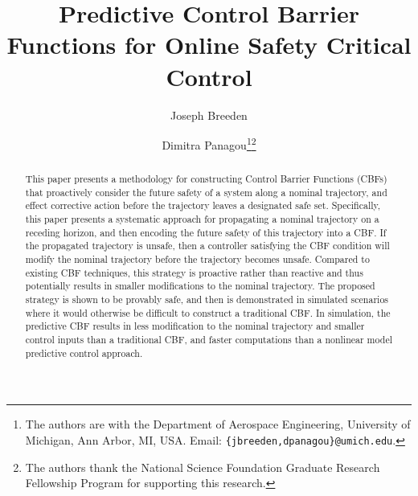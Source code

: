 \documentclass[10pt,conference]{ieeeconf}
\newcommand{\todo}[1]{\textcolor{red}{To Do: #1}}
\renewcommand{\(}{\left(}
\renewcommand{\)}{\right)}
\renewcommand{\[}{\left[}
\renewcommand{\]}{\right]}
\begin{document}
\title{{\fontsize{16}{16} \bf Predictive Control Barrier Functions for Online Safety Critical Control}}%

\author{Joseph Breeden \and Dimitra Panagou\thanks{The authors are with the Department of Aerospace Engineering, University of Michigan, Ann Arbor, MI, USA. Email: \texttt{\{jbreeden,dpanagou\}@umich.edu}.}\thanks{The authors thank the National Science Foundation Graduate Research Fellowship Program for supporting this research.}}

\maketitle

\begin{abstract}
	
This paper presents a methodology for constructing Control Barrier Functions (CBFs) that proactively consider the future safety of a system along a nominal trajectory, and effect corrective action before the trajectory leaves a designated safe set. Specifically, this paper presents a systematic approach for propagating a nominal trajectory on a receding horizon, and then encoding the future safety of this trajectory into a CBF. If the {propagated} trajectory is unsafe, then a controller satisfying the CBF condition will modify the nominal trajectory before the trajectory becomes unsafe. Compared to existing CBF techniques, this strategy is proactive rather than reactive and thus potentially results in smaller modifications to the nominal trajectory. The proposed strategy is shown to be provably safe, and then is demonstrated in simulated scenarios where it would otherwise be difficult to construct a traditional CBF. In simulation, the predictive CBF results in less modification to the nominal trajectory and smaller control inputs than a traditional CBF, and faster computations than a nonlinear model predictive control approach.


\end{abstract}
\end{document}
